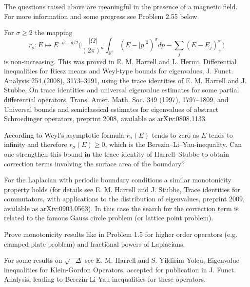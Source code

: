 \documentclass[12pt,letterpaper, reqno]{amsart}
\begin{document}
\begin{problemblock}
\begin{problem}[1.4] 
 The questions raised above are meaningful in the presence of a magnetic field. For more information and some progress see Problem 2.55 below.
\end{problem}
\end{problemblock}

\begin{problemblock}
For $\sigma\geq 2$ the mapping
$$
   r_{\sigma}: E\mapsto E^{-\sigma-d/2}\bigg(\frac{|\Omega|}{(2\pi)^n}\int_{\mathbb{R}^n}(E-|p|^2)^{\sigma}dp -\sum_j(E-E_j)_{+}^{\sigma}\bigg)
$$
is non-increasing. This was proved in E. M. Harrell and L. Hermi, Differential inequalities for
Riesz means and Weyl-type bounds for eigenvalues, {J. Funct.
Analysis} {254} (2008), 3173--3191, using the trace identities of E. M. Harrell and J. Stubbe, On trace identities and universal eigenvalue estimates for some partial differential
operators, {Trans. Amer. Math. Soc.} {349} (1997),
1797--1809, and Universal bounds and
semiclassical estimates for eigenvalues of abstract Schroedinger
operators, preprint 2008, available as arXiv:0808.1133.

\begin{problem}[1.5] 
According to Weyl's asymptotic formula
$r_{\sigma}(E)$ tends to zero as $E$ tends to infinity and
therefore $r_{\sigma}(E)\geq 0$, which is the
Berezin--Li--Yau-inequality. Can one strengthen this bound in the
trace identity of Harrell--Stubbe to obtain correction
terms involving the surface area of the boundary?
\end{problem}

\begin{distinguishedremark}
 For the
Laplacian with periodic boundary conditions a similar monotonicity
property holds (for details see E. M. Harrell and J. Stubbe, Trace identities for
commutators, with applications to the distribution of
eigenvalues, preprint 2009, available as arXiv:0903.0563). In this case the
search for the correction term is related to the famous Gauss
circle problem (or lattice point problem).
\end{distinguishedremark}
\end{problemblock}


\begin{problemblock}

\begin{problem}[1.55] 
Prove monotonicity results like in Problem 1.5 for higher
order operators (e.g. clamped plate problem) and fractional powers
of Laplacians.
\end{problem}

\begin{distinguishedremark}
For some results on $\sqrt{-\Delta}$ see E. M.
Harrell and S. Yildirim Yolcu, Eigenvalue
inequalities for Klein-Gordon Operators, accepted for publication
in J. Funct. Analysis, leading to Berezin-Li-Yau inequalities for
these operators.
\end{distinguishedremark}

\end{problemblock}
\end{document}
